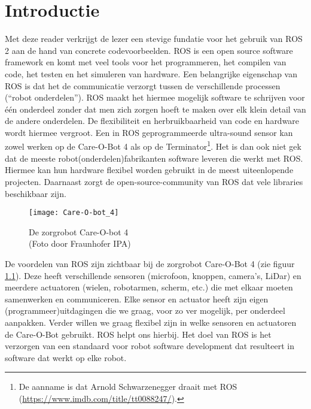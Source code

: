 \chapter{Introductie}

\noindent Met deze reader verkrijgt de lezer een stevige fundatie voor het gebruik van ROS 2 aan de hand van concrete codevoorbeelden. ROS is een open source software framework en komt met veel tools voor het programmeren, het compilen van code, het testen en het simuleren van hardware. Een belangrijke eigenschap van ROS is dat het de communicatie verzorgt tussen de verschillende processen (``robot onderdelen''). ROS maakt het hiermee mogelijk software te schrijven voor \'e\'en onderdeel zonder dat men zich zorgen hoeft te maken over elk klein detail van de andere onderdelen. De flexibiliteit en herbruikbaarheid van code en hardware wordt hiermee vergroot. Een in ROS geprogrammeerde ultra-sound sensor kan zowel werken op de Care-O-Bot 4 als op de Terminator\footnote{De aanname is dat Arnold Schwarzenegger draait met ROS (\url{https://www.imdb.com/title/tt0088247/}).}. Het is dan ook niet gek dat de meeste robot(onderdelen)fabrikanten software leveren die werkt met ROS. Hiermee kan hun hardware flexibel worden gebruikt in de meest uiteenlopende projecten. Daarnaast zorgt de open-source-community van ROS dat vele libraries beschikbaar zijn.

\begin{figure}[ht]
\begin{center}
\texttt{[image: Care-O-bot\_4]}\\
\end{center}
\caption{De zorgrobot Care-O-bot 4\\\tiny{(Foto door Fraunhofer IPA)}}\label{fig:care-o-bot4}
\end{figure}

De voordelen van ROS zijn zichtbaar bij de zorgrobot Care-O-Bot 4 (zie figuur \ref{fig:care-o-bot4}). Deze heeft verschillende sensoren (microfoon, knoppen, camera's, LiDar) en meerdere actuatoren (wielen, robotarmen, scherm, etc.) die met elkaar moeten samenwerken en communiceren. Elke sensor en actuator heeft zijn eigen (programmeer)uitdagingen die we graag, voor zo ver mogelijk, per onderdeel aanpakken. Verder willen we graag flexibel zijn in welke sensoren en actuatoren de Care-O-Bot gebruikt. ROS helpt ons hierbij. Het doel van ROS is het verzorgen van een standaard voor robot software development dat resulteert in software dat werkt op elke robot. 

